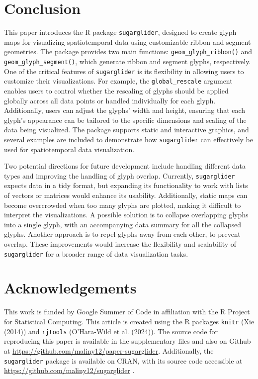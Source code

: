 \hypertarget{conclusion}{%
\section{Conclusion}\label{conclusion}}

This paper introduces the R package \texttt{sugarglider}, designed to create glyph maps for visualizing spatiotemporal data using customizable ribbon and segment geometries. The package provides two main functions: \texttt{geom\_glyph\_ribbon()} and \texttt{geom\_glyph\_segment()}, which generate ribbon and segment glyphs, respectively. One of the critical features of \texttt{sugarglider} is its flexibility in allowing users to customize their visualizations. For example, the \texttt{global\_rescale} argument enables users to control whether the rescaling of glyphs should be applied globally across all data points or handled individually for each glyph. Additionally, users can adjust the glyphs' width and height, ensuring that each glyph's appearance can be tailored to the specific dimensions and scaling of the data being visualized. The package supports static and interactive graphics, and several examples are included to demonstrate how \texttt{sugarglider} can effectively be used for spatiotemporal data visualization.

Two potential directions for future development include handling different data types and improving the handling of glyph overlap. Currently, \texttt{sugarglider} expects data in a tidy format, but expanding its functionality to work with lists of vectors or matrices would enhance its usability. Additionally, static maps can become overcrowded when too many glyphs are plotted, making it difficult to interpret the visualizations. A possible solution is to collapse overlapping glyphs into a single glyph, with an accompanying data summary for all the collapsed glyphs. Another approach is to repel glyphs away from each other, to prevent overlap. These improvements would increase the flexibility and scalability of \texttt{sugarglider} for a broader range of data visualization tasks.

\hypertarget{acknowledgements}{%
\section{Acknowledgements}\label{acknowledgements}}

This work is funded by Google Summer of Code in affiliation with the R Project for Statistical Computing. This article is created using the R packages \texttt{knitr} (Xie (2014)) and \texttt{rjtools} (O'Hara-Wild et al. (2024)). The source code for reproducing this paper is available in the supplementary files and also on Github at \url{https://github.com/maliny12/paper-sugarglider}. Additionally, the \texttt{sugarglider} package is available on CRAN, with its source code accessible at \url{https://github.com/maliny12/sugarglider} .

